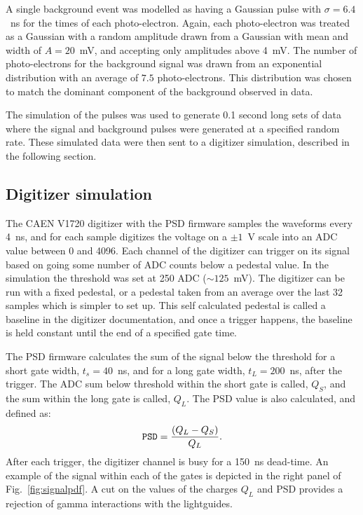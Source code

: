 \documentclass[letter,twocolumn,preprint,3p,numbers,sort&compress]{elsarticle}
\begin{document}
A single background event was modelled as having a Gaussian pulse with
$\sigma=6.4$~ns for the times of each photo-electron.  Again, each
photo-electron was treated as a Gaussian with a random amplitude drawn
from a Gaussian with mean and width of $A=20$~mV, and accepting only
amplitudes above 4~mV.  The number of photo-electrons for the
background signal was drawn from an exponential distribution with an
average of $7.5$ photo-electrons.  This distribution was chosen to match
the dominant component of the background observed in data.

The simulation of the pulses was used to generate 0.1 second long sets
of data where the signal and background pulses were generated at a
specified random rate.  These simulated data were then sent to a
digitizer simulation, described in the following section.


\subsection{ Digitizer simulation }\label{sec:digisim}
 
The CAEN V1720 digitizer with the PSD firmware samples the waveforms
every 4~ns, and for each sample digitizes the voltage on a $\pm 1$~V
scale into an ADC value between 0 and 4096.  Each channel of the
digitizer can trigger on its signal based on going some number of ADC
counts below a pedestal value.  In the simulation the threshold was
set at 250 ADC ($\sim 125$~mV).  The digitizer can be run with a fixed
pedestal, or a pedestal taken from an average over the last 32 samples
which is simpler to set up.  This self calculated pedestal is called a
baseline in the digitizer documentation, and once a trigger happens,
the baseline is held constant until the end of a specified gate time.

The PSD firmware calculates the sum of the signal below the threshold
for a short gate width, $t_s=40$~ns, and for a long gate width,
$t_L=200$~ns, after the trigger.  The ADC sum below threshold within
the short gate is called, $Q_S$, and the sum within the long gate is
called, $Q_L$.  The PSD value is also calculated, and defined as:
\begin{equation}
{\tt PSD} = \frac{ (Q_L - Q_S)} { Q_L }.
\end{equation}
After each trigger, the digitizer channel is busy for a 150~ns
dead-time.  An example of the signal within each of the gates is
depicted in the right panel of Fig.~\ref{fig:signalpdf}.  A cut on the
values of the charges $Q_L$ and PSD provides a rejection of gamma
interactions with the lightguides.
\end{document}
